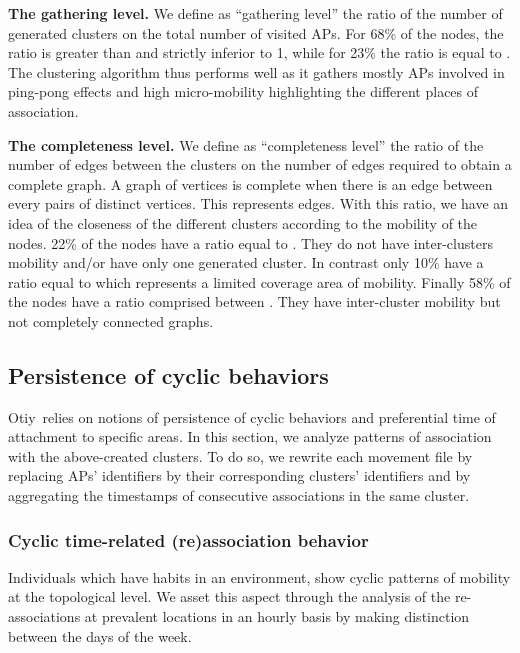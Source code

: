 \documentclass[a4paper]{sig-alternate-10pt}
\newcommand{\otiy}{{\sffamily Otiy}}
\begin{document}
\noindent \textbf{The gathering level.} We define as ``gathering
level'' the ratio of the number of generated clusters on the total
number of visited APs. For 68\% of the nodes, the ratio is
greater than  and strictly inferior to 1, while for 23\% the
ratio is equal to . The clustering algorithm thus performs well
as it gathers mostly APs involved in ping-pong effects and high
micro-mobility highlighting the different places of association.\vspace{2mm}

\noindent \textbf{The completeness level.} We define as
``completeness level'' the ratio of the number of edges between the
clusters on the number of edges required to obtain a complete graph.
A graph of  vertices is complete when there is an edge between
every pairs of distinct vertices. This represents 
edges. With this ratio, we have an idea of the closeness of the
different clusters according to the mobility of the nodes.
22\% of the nodes have a ratio equal to . They do not have
inter-clusters mobility and/or have only one generated cluster. In
contrast only 10\% have a ratio equal to  which represents a
limited coverage area of mobility. Finally 58\% of the nodes
have a ratio comprised between . They have inter-cluster
mobility but not completely connected graphs.


\subsection{Persistence of cyclic behaviors}
\label{sec:cyclic}

\otiy\ relies on notions of persistence of cyclic behaviors and
preferential time of attachment to specific areas. In this section,
we analyze patterns of association with the above-created clusters.
To do so, we rewrite each movement file by replacing APs'
identifiers by their cor\-responding clusters' identifiers and by
aggregating the timestamps of consecutive associations in the same
cluster.

\subsubsection{Cyclic time-related (re)association behavior}
\label{sssec:cyclic_t_ass}

Individuals which have habits in an environment, show cyclic
patterns of mobility at the topological level. We asset this aspect
through the analysis of the re-associations at prevalent locations
in an hourly basis by making distinction between the days of the
week.
\end{document}
